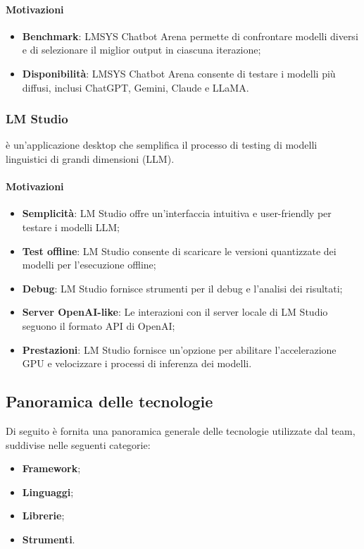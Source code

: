 \paragraph*{Motivazioni}
\begin{itemize}
  \item \textbf{Benchmark}: LMSYS Chatbot Arena permette di confrontare modelli diversi e di selezionare il miglior output in ciascuna iterazione;
  \item \textbf{Disponibilità}: LMSYS Chatbot Arena consente di testare i modelli più diffusi, inclusi ChatGPT, Gemini, Claude e LLaMA.
\end{itemize}

\subsubsection{LM Studio}\label{sec:lmstudio}
\par {} è un'applicazione desktop che semplifica il processo di testing di modelli linguistici di grandi dimensioni (LLM).
\paragraph*{Motivazioni}
\begin{itemize}
  \item \textbf{Semplicità}: LM Studio offre un'interfaccia intuitiva e user-friendly per testare i modelli LLM;
  \item \textbf{Test offline}: LM Studio consente di scaricare le versioni quantizzate dei modelli per l'esecuzione offline;
  \item \textbf{Debug}: LM Studio fornisce strumenti per il debug e l'analisi dei risultati;
  \item \textbf{Server OpenAI-like}: Le interazioni con il server locale di LM Studio seguono il formato API di OpenAI;
  \item \textbf{Prestazioni}: LM Studio fornisce un’opzione per abilitare l'accelerazione GPU e velocizzare i processi di inferenza dei modelli.
\end{itemize}

\subsection{Panoramica delle tecnologie}\label{sec:panoramica-tecnologie}
\par Di seguito è fornita una panoramica generale delle tecnologie utilizzate dal team, suddivise nelle seguenti categorie:
\begin{itemize}
  \item \textbf{Framework};
  \item \textbf{Linguaggi};
  \item \textbf{Librerie};
  \item \textbf{Strumenti}.
\end{itemize}

